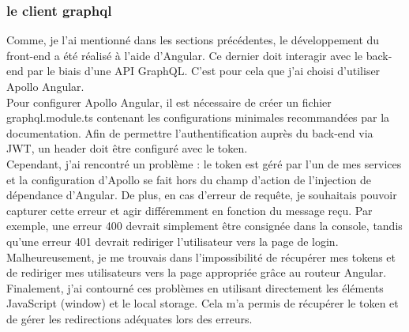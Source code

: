 \subsubsection{le client graphql}

Comme, je l'ai mentionné dans les sections précédentes, le développement du front-end a été réalisé à l'aide d'Angular.
Ce dernier doit interagir avec le back-end par le biais d'une API GraphQL. C'est pour cela que j'ai choisi d'utiliser Apollo Angular.\\

Pour configurer Apollo Angular, il est nécessaire de créer un fichier graphql.module.ts contenant les configurations minimales recommandées par la documentation.
Afin de permettre l'authentification auprès du back-end via JWT, un header doit être configuré avec le token.\\

Cependant, j'ai rencontré un problème : le token est géré par l'un de mes services et la configuration d'Apollo se fait hors du champ d'action de l'injection de dépendance d'Angular.
De plus, en cas d'erreur de requête, je souhaitais pouvoir capturer cette erreur et agir différemment en fonction du message reçu.
Par exemple, une erreur 400 devrait simplement être consignée dans la console, tandis qu'une erreur 401 devrait rediriger l'utilisateur vers la page de login.\\

Malheureusement, je me trouvais dans l'impossibilité de récupérer mes tokens et de rediriger mes utilisateurs vers la page appropriée grâce au routeur Angular.\\

Finalement, j'ai contourné ces problèmes en utilisant directement les éléments JavaScript (window) et le local storage.
Cela m'a permis de récupérer le token et de gérer les redirections adéquates lors des erreurs.
